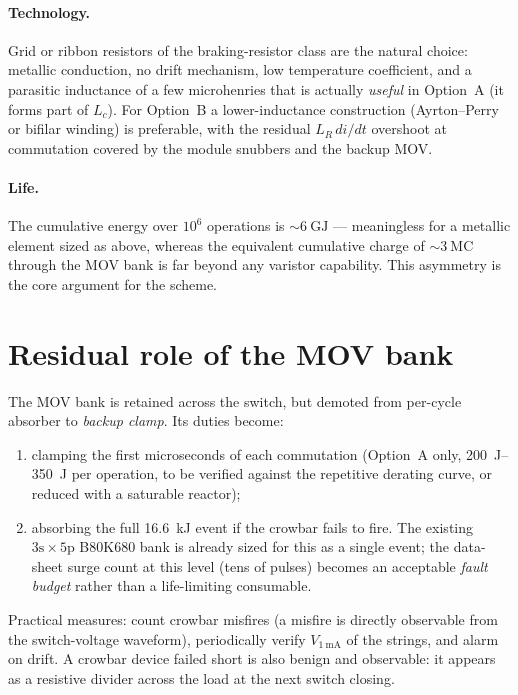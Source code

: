 \documentclass[11pt,a4paper]{article}
\begin{document}
\paragraph{Technology.} Grid or ribbon resistors of the braking-resistor
class are the natural choice: metallic conduction, no drift mechanism, low
temperature coefficient, and a parasitic inductance of a few microhenries
that is actually \emph{useful} in Option~A (it forms part of $L_c$). For
Option~B a lower-inductance construction (Ayrton--Perry or bifilar winding)
is preferable, with the residual $L_R\, di/dt$ overshoot at commutation
covered by the module snubbers and the backup MOV.

\paragraph{Life.} The cumulative energy over $10^6$ operations is
$\sim\SI{6}{\giga\joule}$ --- meaningless for a metallic element sized as
above, whereas the equivalent cumulative charge of $\sim\SI{3}{\mega\coulomb}$
through the MOV bank is far beyond any varistor capability. This asymmetry is
the core argument for the scheme.

\section{Residual role of the MOV bank}
\label{sec:backup}

The MOV bank is retained across the switch, but demoted from per-cycle
absorber to \emph{backup clamp}. Its duties become:
\begin{enumerate}
\item clamping the first microseconds of each commutation (Option~A only,
\SIrange{200}{350}{\joule} per operation, to be verified against the
repetitive derating curve, or reduced with a saturable reactor);
\item absorbing the full \SI{16.6}{\kilo\joule} event if the crowbar fails to
fire. The existing $3\mathrm{s}\times 5\mathrm{p}$ B80K680 bank is already
sized for this as a single event; the data-sheet surge count at this level
(tens of pulses) becomes an acceptable \emph{fault budget} rather than a
life-limiting consumable.
\end{enumerate}
Practical measures: count crowbar misfires (a misfire is directly observable
from the switch-voltage waveform), periodically verify
$V_{\SI{1}{\milli\ampere}}$ of the strings, and alarm on drift. A crowbar
device failed short is also benign and observable: it appears as a resistive
divider across the load at the next switch closing.
\end{document}
